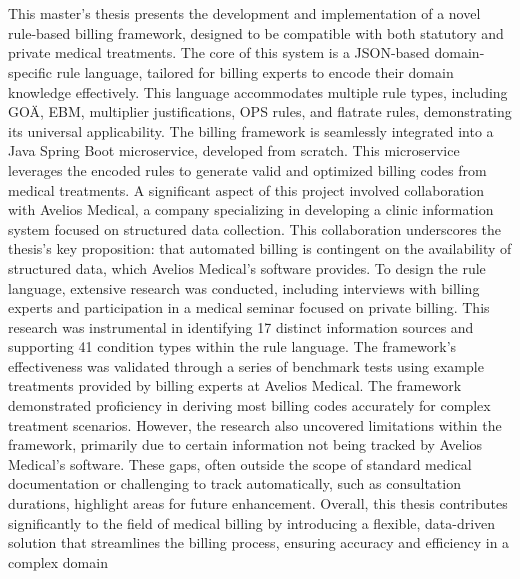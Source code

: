 \chapter{\abstractname}

This master's thesis presents the development and implementation of a novel rule-based billing framework, designed to be compatible with both statutory and private medical treatments.
The core of this system is a JSON-based domain-specific rule language, tailored for billing experts to encode their domain knowledge effectively.
This language accommodates multiple rule types, including GOÄ, EBM, multiplier justifications, OPS rules, and flatrate rules, demonstrating its universal applicability.
The billing framework is seamlessly integrated into a Java Spring Boot microservice, developed from scratch.
This microservice leverages the encoded rules to generate valid and optimized billing codes from medical treatments.
A significant aspect of this project involved collaboration with Avelios Medical, a company specializing in developing a clinic information system focused on structured data collection.
This collaboration underscores the thesis's key proposition: that automated billing is contingent on the availability of structured data, which Avelios Medical's software provides.
To design the rule language, extensive research was conducted, including interviews with billing experts and participation in a medical seminar focused on private billing.
This research was instrumental in identifying 17 distinct information sources and supporting 41 condition types within the rule language.
The framework's effectiveness was validated through a series of benchmark tests using example treatments provided by billing experts at Avelios Medical.
The framework demonstrated proficiency in deriving most billing codes accurately for complex treatment scenarios.
However, the research also uncovered limitations within the framework, primarily due to certain information not being tracked by Avelios Medical's software.
These gaps, often outside the scope of standard medical documentation or challenging to track automatically, such as consultation durations, highlight areas for future enhancement.
Overall, this thesis contributes significantly to the field of medical billing by introducing a flexible, data-driven solution that streamlines the billing process, ensuring accuracy and efficiency in a complex domain
